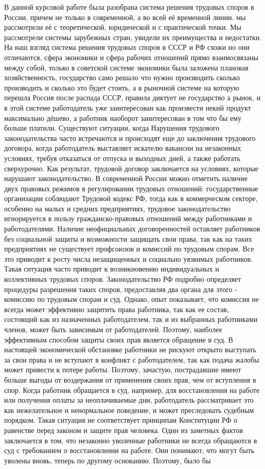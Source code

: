 В данной курсовой работе была разобрана система решения трудовых споров в России, причем не только в современной, а во всей её временной линии. мы рассмотрели её с теоретической, юридической и с практической точки. Мы рассмотрели системы зарубежных стран, увидели их преимущества и недостатки. На наш взгляд система решения трудовых споров в СССР и РФ схожи но они отличаются, сфера экономики и сфера рабочих отношений прямо взаимосвязаны между собой, только в советской системе экономики была заложена плановая хозяйственность, государство само решало что нужно производить сколько производить и сколько это будет стоить, а в рыночной системе на которую перешла Россия после распада СССР, правила диктует не государство а рынок, и в этой системе работодатель уже заинтересован как произвести некий продукт максимально дёшево, а работник наоборот заинтересован в том что бы ему больше платили. Существуют ситуации, когда Нарушения трудового законодательства часто встречаются и происходят еще до заключения трудового договора, когда работодатель выставляет искателю вакансии на незаконных условиях, требуя отказаться от отпуска и выходных дней, а также работать сверхурочно. Как результат, трудовой договор заключается на условиях, которые нарушают законодательство. В современной России можно отметить наличие двух правовых режимов в регулировании трудовых отношений: государственные организации соблюдают Трудовой кодекс РФ, тогда как в коммерческом секторе, особенно на малых и средних предприятиях, трудовое законодательство игнорируется в пользу гражданско-правовых отношений между работниками и работодателями. Наличие неофициальных договоренностей оставляет работников без социальной защиты и возможности защищать свои права, так как на таких предприятиях не существует профсоюзов и комиссий по трудовым спорам. Все это приводит к росту числа незащищенных и социально уязвимых работников. Такая ситуация часто приводит к возникновению индивидуальных и коллективных трудовых споров. Законодательство РФ подробно определяет процедуры разрешения таких споров, предоставляя два органа для этого - комиссию по трудовым спорам и суд. Однако, опыт показывает, что комиссия не всегда может эффективно защитить права работника, так как ее состав, состоящий как из назначенных работодателем, так и из выбранных работниками членов, может быть зависимым от работодателей. Поэтому, наиболее эффективным способом защиты своих прав является обращение в суд. В настоящей экономической обстановке работники не рискуют открыто выступать за свои права и не вступают в конфликт с работодателем, так как подача жалобы может привести к потере работы. Поэтому, зачастую, пострадавшие имеют больше выгоды от воздержания от применения своих прав, чем от вступления в спор. Когда работник обращается в суд, например, для восстановления на работе или получения оплаты за неоплачиваемые дни, работодатель рассматривает это как нежелательное и ненормальное поведение, и может преследовать судебным порядком. Такая ситуация не соответствует принципам Конституции РФ о равенстве перед законом и защите прав человека. Один из заметных фактов заключается в том, что незаконно уволенные работники не всегда обращаются в суд с требованием о восстановлении на работе. Они понимают, что могут быть уволены вновь, теперь по другому основанию. Поэтому, было бы 